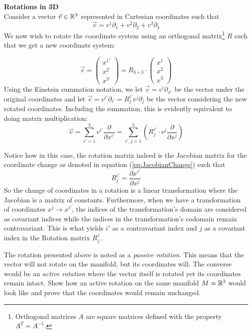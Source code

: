\documentclass{article}
\begin{document}
 		\begin{exmp}
 			\textbf{Rotations in 3D}\\
 			Consider a vector $\vec{v} \in \mathbb{R}^3$ represented in Cartesian coordinates such that
 			$$ \vec{v} = v^1 \partial_1 + v^2 \partial_2 + v^3 \partial_3$$
 			We now wish to rotate the coordinate system using an orthogonal matrix\footnote{Orthogonal matrices $A$ are square matrices defined with the property $A^T = A^{-1}$.} $R$ such that we get a new coordinate system:
 			
 			$$ \vec{v} = \begin{pmatrix}
 				x^{1'} \\
 				x^{2'} \\
 				x^{3'}
 			\end{pmatrix} = R_{3\times3} \cdot \begin{pmatrix}
 				x^1 \\
 				x^2 \\
 				x^3
 			\end{pmatrix}$$
 			Using the Einstein summation notation, we let $\vec{v} = v^i \partial_{x^i}$ be the vector under the original coordinates and let $\vec{v} = v^{i'}\partial_{i'} = R_j^{i'} v^j \partial_{j}$ be the vector considering the new rotated coordinates. Including the summation, this is evidently equivalent to doing matrix multiplication:
 			$$ \vec{v} = \sum_{i'=1}^3 v^{i'}\frac{\partial}{\partial x^{i'}}=\sum_{i', j = 1}^3 \left(R_j^{i'}\cdot v^j\frac{\partial}{\partial x^{j}}\right) $$
 			
 			\pagebreak \noindent
 			Notice how in this case, the rotation matrix indeed is the Jacobian matrix for the coordinate change as denoted in equation (\ref{eq:JacobianChange}) such that
 			$$ R_{j}^{i'} = \frac{\partial x^{i'}}{\partial x^j}$$
 			So the change of coordinates in a rotation is a linear transformation where the Jacobian is a matrix of constants. 
 			Furthermore, when we have a transformation of coordinates $x^{j} \to x^{i'}$, the indices of the transformation's domain are considered as covariant indices while the indices in the transformation's codomain remain contravariant. This is what yields $i'$ as a contravariant index and $j$ as a covariant index in the Rotation matrix $R_j^{i'}$.
 		\end{exmp}
 		\begin{exe}
 			The rotation presented above is noted as a \textit{passive rotation}. This means that the vector will not rotate on the manifold, but its coordinates will. The converse would be an \textit{active rotation} where the vector itself is rotated yet its coordinates remain intact.
 			Show how an active rotation on the same manifold $M=\mathbb{R}^3$ would look like and prove that the coordinates would remain unchanged.
 		\end{exe}
\end{document}
